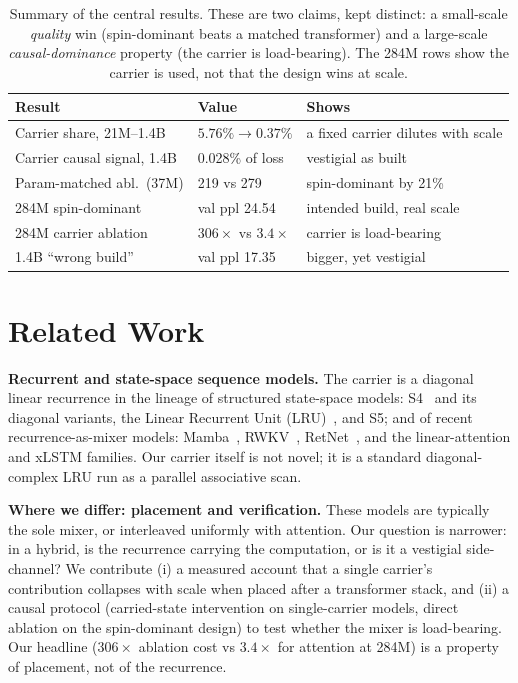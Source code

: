 \documentclass[journal]{IEEEtran}
\begin{document}
\begin{table}[t]\centering\small
\caption{Summary of the central results. These are two claims, kept distinct: a small-scale \emph{quality} win (spin-dominant beats a matched transformer) and a large-scale \emph{causal-dominance} property (the carrier is load-bearing). The 284M rows show the carrier is used, not that the design wins at scale.}
\label{tab:summary}
\begin{tabular}{@{}p{3.6cm} l p{2.6cm}@{}}
\toprule
Result & Value & Shows \\
\midrule
Carrier share, 21M--1.4B & $5.76\% \to 0.37\%$ & a fixed carrier dilutes with scale \\
Carrier causal signal, 1.4B & 0.028\% of loss & vestigial as built \\
Param-matched abl.\ (37M) & 219 vs 279 & spin-dominant by 21\% \\
284M spin-dominant & val ppl 24.54 & intended build, real scale \\
284M carrier ablation & $306\times$ vs $3.4\times$ & carrier is load-bearing \\
1.4B ``wrong build'' & val ppl 17.35 & bigger, yet vestigial \\
\bottomrule
\end{tabular}
\end{table}

\section{Related Work}
\textbf{Recurrent and state-space sequence models.} The carrier is a diagonal linear recurrence in the lineage of structured state-space models: S4~\cite{gu2022s4} and its diagonal variants, the Linear Recurrent Unit (LRU)~\cite{orvieto2023lru}, and S5; and of recent recurrence-as-mixer models: Mamba~\cite{gu2023mamba}, RWKV~\cite{peng2023rwkv}, RetNet~\cite{sun2023retnet}, and the linear-attention and xLSTM families. Our carrier itself is not novel; it is a standard diagonal-complex LRU run as a parallel associative scan.

\textbf{Where we differ: placement and verification.} These models are typically the sole mixer, or interleaved uniformly with attention. Our question is narrower: in a hybrid, is the recurrence carrying the computation, or is it a vestigial side-channel? We contribute (i) a measured account that a single carrier's contribution collapses with scale when placed after a transformer stack, and (ii) a causal protocol (carried-state intervention on single-carrier models, direct ablation on the spin-dominant design) to test whether the mixer is load-bearing. Our headline ($306\times$ ablation cost vs $3.4\times$ for attention at 284M) is a property of placement, not of the recurrence.
\end{document}
